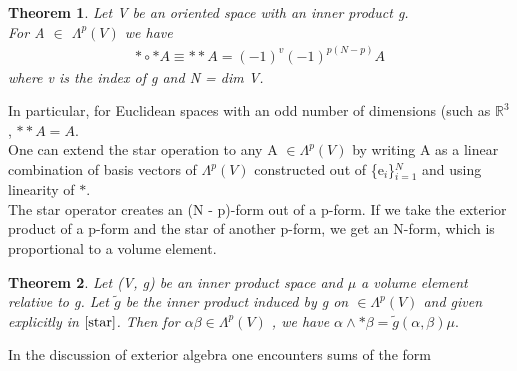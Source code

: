 \documentclass[12pt,a4paper]{article}
\newtheorem{thm}{Theorem}
\begin{document}
\begin{thm}
Let V be an oriented space with an inner product g.\\
For A $\in$ $\Lambda^{p}(V)$ we have
\begin{eqnarray*}
\ast \circ \ast A \equiv \ast \ast A = (-1)^v(-1)^{p(N-p)}A
\end{eqnarray*}
where v is the index of g and N = dim V.
\end{thm}
In particular, for Euclidean spaces with an odd number of dimensions
(such as $\mathbb{R}^3$, $\ast \ast A = A.$\\
One can extend the star operation to any A $\in \Lambda^{p}(V)$ by writing A as a linear combination of basis vectors of $\Lambda^{p}(V)$ constructed out of 
\{e$_i$\}$^N_{i=1}$ and using linearity of $\ast$.\\
The star operator creates an (N - p)-form out of a p-form. If we take
the exterior product of a p-form and the star of another p-form, we get an
N-form, which is proportional to a volume element.
\begin{thm}
Let (V, g) be an inner product space and $\mu$ a volume element relative to g. Let $\widetilde{g}$ be the inner product induced by g on $\in \Lambda^{p}(V)$  and given explicitly in $\ref{star}$. Then for $\alpha \beta \in \Lambda^{p}(V)$ , we have $\alpha \wedge \ast \beta = \widetilde{g}(\alpha, \beta) \mu.$
\end{thm}
In the discussion of exterior algebra one encounters sums of the form
\end{document}
